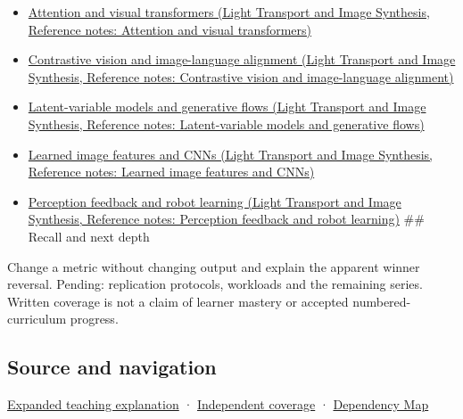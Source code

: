 \begin{itemize}
\tightlist
\item
  \href{../04-Light-Transport-and-Image-Synthesis/main.pdf\#nameddest=appendix-a9d5dfdd164a}{Attention and visual transformers (Light Transport and Image Synthesis, Reference notes: Attention and visual transformers)}
\item
  \href{../04-Light-Transport-and-Image-Synthesis/main.pdf\#nameddest=appendix-772f1fd96148}{Contrastive vision and image-language alignment (Light Transport and Image Synthesis, Reference notes: Contrastive vision and image-language alignment)}
\item
  \href{../04-Light-Transport-and-Image-Synthesis/main.pdf\#nameddest=appendix-2c568f05ee34}{Latent-variable models and generative flows (Light Transport and Image Synthesis, Reference notes: Latent-variable models and generative flows)}
\item
  \href{../04-Light-Transport-and-Image-Synthesis/main.pdf\#nameddest=appendix-47c51ea026fb}{Learned image features and CNNs (Light Transport and Image Synthesis, Reference notes: Learned image features and CNNs)}
\item
  \href{../04-Light-Transport-and-Image-Synthesis/main.pdf\#nameddest=appendix-b0c42da325f1}{Perception feedback and robot learning (Light Transport and Image Synthesis, Reference notes: Perception feedback and robot learning)} \#\# Recall and next depth
\end{itemize}

Change a metric without changing output and explain the apparent winner reversal. Pending: replication protocols, workloads and the remaining series. Written coverage is not a claim of learner mastery or accepted numbered-curriculum progress.

\subsection{Source and navigation}\label{appendix-65788587ef78-source-and-navigation}

\hyperref[04-visual-computing-ii-ch042-make-the-mathematics-operational-without-pretending-to-run-a-human-study]{Expanded teaching explanation} · \hyperref[appendix-fd090d982a15-xr01---independent-seeing-and-representation-source]{Independent coverage} · \hyperref[appendix-4ad47bdd269a]{Dependency Map}
